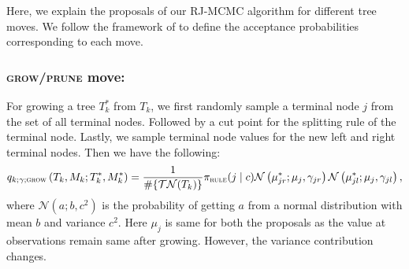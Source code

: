 \documentclass[
12pt]{article}
\begin{document}
	Here, we explain the proposals of our RJ-MCMC algorithm for different tree moves. We follow the framework of \cite{green_RJMCMC} to define the acceptance probabilities corresponding to each move.
	
	
	\subsubsection{\textsc{grow}/\textsc{prune} move:}
	For growing a tree $T^{\ast}_k$ from $T_k$, we first randomly sample a terminal node $j$ from the set of all terminal nodes. Followed by a cut point for the splitting rule of the terminal node. Lastly, we sample terminal node values for the new left and right terminal nodes. Then we have the following:
	\begin{equation*}
		q_{k;\gamma;\textsc{grow}}\left(T_k,M_k;T_k^{\ast}, M_k^{\ast}\right) 
		= \frac{1}{\#\{\mathcal{TN}(T_k)\}} \pi_{\textsc{rule}}(j\mid c)\mathcal{N}\left(\mu_{jr}^{\ast};\mu_{j},\gamma_{jr}\right)\mathcal{N}\left(\mu_{jl}^{\ast};\mu_{j},\gamma_{jl}\right),
	\end{equation*} 
	where $\mathcal{N}(a;b,c^2)$ is the probability of getting $a$ from a normal distribution with mean $b$ and variance $c^2$. Here $\mu_j$ is same for both the proposals as the value at observations remain same after growing. However, the variance contribution changes.
	
\end{document}
